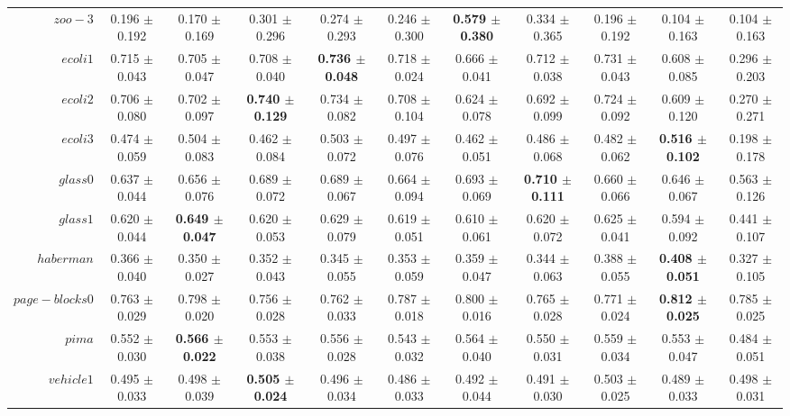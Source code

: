\begin{table}[!ht]
{\begin{tabular}{r c c c c c c c c c c}
$zoo-3$ & 0.196 $\pm$ 0.192 & 0.170 $\pm$ 0.169 & 0.301 $\pm$ 0.296 & 0.274 $\pm$ 0.293 & 0.246 $\pm$ 0.300 & \textbf{0.579 $\pm$ 0.380} & 0.334 $\pm$ 0.365 & 0.196 $\pm$ 0.192 & 0.104 $\pm$ 0.163 & 0.104 $\pm$ 0.163 \\
$ecoli1$ & 0.715 $\pm$ 0.043 & 0.705 $\pm$ 0.047 & 0.708 $\pm$ 0.040 & \textbf{0.736 $\pm$ 0.048} & 0.718 $\pm$ 0.024 & 0.666 $\pm$ 0.041 & 0.712 $\pm$ 0.038 & 0.731 $\pm$ 0.043 & 0.608 $\pm$ 0.085 & 0.296 $\pm$ 0.203 \\
$ecoli2$ & 0.706 $\pm$ 0.080 & 0.702 $\pm$ 0.097 & \textbf{0.740 $\pm$ 0.129} & 0.734 $\pm$ 0.082 & 0.708 $\pm$ 0.104 & 0.624 $\pm$ 0.078 & 0.692 $\pm$ 0.099 & 0.724 $\pm$ 0.092 & 0.609 $\pm$ 0.120 & 0.270 $\pm$ 0.271 \\
$ecoli3$ & 0.474 $\pm$ 0.059 & 0.504 $\pm$ 0.083 & 0.462 $\pm$ 0.084 & 0.503 $\pm$ 0.072 & 0.497 $\pm$ 0.076 & 0.462 $\pm$ 0.051 & 0.486 $\pm$ 0.068 & 0.482 $\pm$ 0.062 & \textbf{0.516 $\pm$ 0.102} & 0.198 $\pm$ 0.178 \\
$glass0$ & 0.637 $\pm$ 0.044 & 0.656 $\pm$ 0.076 & 0.689 $\pm$ 0.072 & 0.689 $\pm$ 0.067 & 0.664 $\pm$ 0.094 & 0.693 $\pm$ 0.069 & \textbf{0.710 $\pm$ 0.111} & 0.660 $\pm$ 0.066 & 0.646 $\pm$ 0.067 & 0.563 $\pm$ 0.126 \\
$glass1$ & 0.620 $\pm$ 0.044 & \textbf{0.649 $\pm$ 0.047} & 0.620 $\pm$ 0.053 & 0.629 $\pm$ 0.079 & 0.619 $\pm$ 0.051 & 0.610 $\pm$ 0.061 & 0.620 $\pm$ 0.072 & 0.625 $\pm$ 0.041 & 0.594 $\pm$ 0.092 & 0.441 $\pm$ 0.107 \\
$haberman$ & 0.366 $\pm$ 0.040 & 0.350 $\pm$ 0.027 & 0.352 $\pm$ 0.043 & 0.345 $\pm$ 0.055 & 0.353 $\pm$ 0.059 & 0.359 $\pm$ 0.047 & 0.344 $\pm$ 0.063 & 0.388 $\pm$ 0.055 & \textbf{0.408 $\pm$ 0.051} & 0.327 $\pm$ 0.105 \\
$page-blocks0$ & 0.763 $\pm$ 0.029 & 0.798 $\pm$ 0.020 & 0.756 $\pm$ 0.028 & 0.762 $\pm$ 0.033 & 0.787 $\pm$ 0.018 & 0.800 $\pm$ 0.016 & 0.765 $\pm$ 0.028 & 0.771 $\pm$ 0.024 & \textbf{0.812 $\pm$ 0.025} & 0.785 $\pm$ 0.025 \\
$pima$ & 0.552 $\pm$ 0.030 & \textbf{0.566 $\pm$ 0.022} & 0.553 $\pm$ 0.038 & 0.556 $\pm$ 0.028 & 0.543 $\pm$ 0.032 & 0.564 $\pm$ 0.040 & 0.550 $\pm$ 0.031 & 0.559 $\pm$ 0.034 & 0.553 $\pm$ 0.047 & 0.484 $\pm$ 0.051 \\
$vehicle1$ & 0.495 $\pm$ 0.033 & 0.498 $\pm$ 0.039 & \textbf{0.505 $\pm$ 0.024} & 0.496 $\pm$ 0.034 & 0.486 $\pm$ 0.033 & 0.492 $\pm$ 0.044 & 0.491 $\pm$ 0.030 & 0.503 $\pm$ 0.025 & 0.489 $\pm$ 0.033 & 0.498 $\pm$ 0.031 \\

\end{tabular}}
\end{table}
